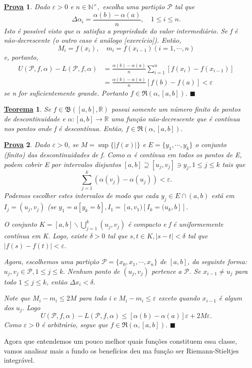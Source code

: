\documentclass{article}
\newtheorem*{theorem*}{\underline{Teorema}}
\newtheorem*{proof*}{\underline{Prova}}
\renewcommand\qedsymbol{$\blacksquare$}
\begin{document}
\begin{proof*}
  Dado \(\varepsilon >0\) e \(n\in \mathbb{N}^{\times},\) escolha uma parti\c cão \(\mathcal{P}\) tal que 
    \[
      \Delta \alpha_{i} = \frac{\alpha (b) - \alpha (a)}{n},\quad 1\leq i\leq n.
    \]
    Isto é possível visto que \(\alpha \) satisfaz a propriedade do valor intermediário. Se
  f é não-decrescente (o outro caso é análogo [exercício]). Então, 
    \[
      M_{i}=f(x_{i}),\quad m_{i}=f(x_{i-1}) (i=1, \cdots, n)
    \]
    e, portanto, 
   \begin{align*}
     U(\mathcal{P}, f, \alpha ) - L(\mathcal{P}, f, \alpha ) &= \frac{\alpha (b) - \alpha (a)}{n}\sum\limits_{i=1}^{n}[f(x_{i})-f(x_{i-1})]\\
                                                             &= \frac{\alpha (b) - \alpha (a)}{n}[f(b)-f(a)] < \varepsilon 
   \end{align*}
  se n for suficientemente grande. Portanto \(f\in \mathfrak{R}(\alpha, [a,b])\). \qedsymbol
\end{proof*}
\begin{theorem*}
  Se \(f\in \mathfrak{B}([a, b], \mathbb{R})\) possui somente um número finito de pontos de
descontinuidade e \(\alpha :[a, b]\rightarrow \mathbb{R}\) uma fun\c cão não-decrescente que é
contínua nos pontos onde f é descontínua. Então, \(f\in \mathfrak{R}(\alpha , [a, b]).\)
\end{theorem*}
\begin{proof*}
  Dado \(\varepsilon >0\), se \(M=\sup\{|f(x)|\}\) e \(E = \{y_{1}, \cdots, y_{k}\}\) o
conjunto (finito) das descontinuidades de f. Como \(\alpha \) é contínua em todos os 
pontos de E, podem cobrir E por intervalos disjuntos \([a, b]\supseteq{[u_{j}, v_{j}]}\ni y_{j}, 1\leq j\leq k\)  tais que 
  \[
    \sum\limits_{j=1}^{k}(\alpha (v_{j})-\alpha (u_{j})) < \varepsilon .
  \]
  Podemos escolher estes intervalos de modo que cada \(y_{j}\in E\cap{(a, b)}\) está em \(I_{j}=(u_{j}, v_{j})\)
(se \(y_{1}=a[y_{k}=b], I_{1}=[a, v_{1})[I_{k}=(u_{k}, b]].\)  

O conjunto \(K=[a, b]\backslash{\bigcup_{j=1}^{k}{(u_{j},v_{j})}}\) é compacto e f é uniformemente
contínua em K. Logo, existe \(\delta >0\) tal que \(s, t\in K, |s-t| < \delta \) tal que
 \(|f(s) - f(t)| < \varepsilon .\)

  Agora, escolhemos uma parti\c cão \(\mathcal{P} = \{x_{0}, x_{1}, \cdots, x_{n}\}\) de \([a, b]\), da
seguinte forma: \(u_{j}, v_{j}\in \mathcal{P}, 1\leq j\leq k.\) Nenhum ponto
de \((u_{j}, v_{j})\) pertence a \(\mathcal{P}\). Se \(x_{i-1}\neq u_{j}\) para todo \(1\leq j\leq k\), então
 \(\Delta x_{i} < \delta.\) 

  Note que \(M_{i}-m_{i}\leq 2M\) para todo i e \(M_{i} - m_{i}\leq \varepsilon \) exceto quando
 \(x_{i-1}\) é algum dos \(u_{j}.\) Logo 
   \[
     U(\mathcal{P}, f, \alpha ) - L(\mathcal{P}, f, \alpha )\leq [\alpha (b) - \alpha (a)]\varepsilon  + 2M\varepsilon.
   \]
  Como \(\varepsilon >0\) é arbitrário, segue que \(f\in \mathfrak{R}(\alpha , [a, b])\). \qedsymbol
\end{proof*}
  Agora que entendemos um pouco melhor quais fun\c cões constituem essa classe, vamos
  analisar mais a fundo os benefícios deu ma fun\c cão ser Riemann-Stieltjes integrável.
\end{document}
